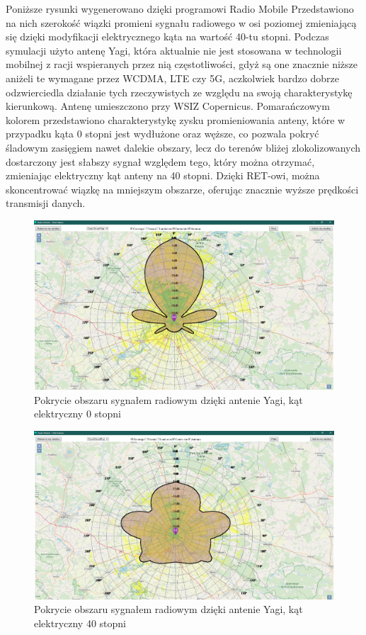 		Poniższe rysunki wygenerowano dzięki programowi Radio Mobile \autocite{RADIO_MOBILE_PAGE_1}
		Przedstawiono na nich szerokość wiązki promieni sygnału radiowego w osi poziomej \autocite{BEAMWIDTH_1}
		zmieniającą się dzięki modyfikacji elektrycznego kąta na wartość 40-tu stopni.
		Podczas symulacji użyto antenę Yagi, która aktualnie nie jest stosowana w technologii mobilnej z racji wspieranych
		przez nią częstotliwości, gdyż są one znacznie niższe aniżeli te wymagane przez WCDMA, LTE czy 5G, 
		aczkolwiek bardzo dobrze odzwierciedla działanie tych rzeczywistych ze względu na swoją charakterystykę kierunkową.
		\newline
		Antenę umieszczono przy WSIZ Copernicus. \newline
		Pomarańczowym kolorem przedstawiono charakterystykę zysku promieniowania anteny, które w przypadku kąta 0 stopni jest wydłużone oraz węższe,
		co pozwala pokryć śladowym zasięgiem nawet dalekie obszary, lecz do terenów bliżej zlokolizowanych dostarczony
		jest słabszy sygnał względem tego, który można otrzymać, zmieniając elektryczny kąt anteny na 40 stopni.
		Dzięki RET-owi, można skoncentrować wiązkę na mniejszym obszarze, oferując znacznie wyższe prędkości transmisji danych.

		\begin{figure}[h!]
		\centering
		\includegraphics[scale=0.5]{Obrazki/Antenna_Yagi_Angle_0.png}
		\caption{Pokrycie obszaru sygnałem radiowym dzięki antenie Yagi, kąt elektryczny 0 stopni}
		\end{figure}

		\begin{figure}[h!]
		\centering
		\includegraphics[scale=0.5]{Obrazki/Antenna_Yagi_Angle_40.png}
		\caption{Pokrycie obszaru sygnałem radiowym dzięki antenie Yagi, kąt elektryczny 40 stopni}
		\end{figure}
